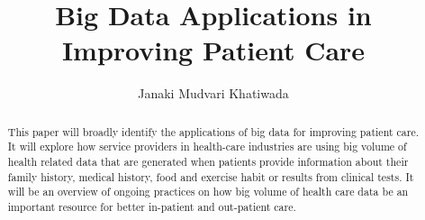\documentclass[sigconf]{acmart}
\begin{document}
\title{Big Data Applications in Improving Patient Care}


\author{Janaki Mudvari Khatiwada}
\orcid{}




\begin{abstract}
 This paper will broadly identify the applications of big data for improving patient care. It will explore how service providers in health-care industries are using big volume of health related data that are generated when patients provide information about their family history, medical history, food and exercise habit or results from clinical tests. It will be an overview of ongoing practices on how big volume of health care data be an important resource for better in-patient and out-patient care.  
\end{abstract}


\maketitle
\end{document}
